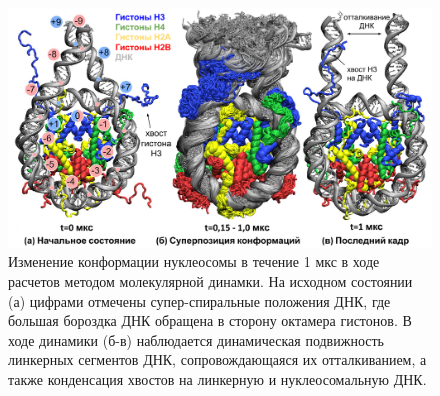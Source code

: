\begin{figure} [H]
    \centering
    \includegraphics[width=\textwidth]{images/p2/jmb/part2_2_f1.pdf}
    \caption{Изменение конформации нуклеосомы в течение 1 мкс в ходе расчетов методом молекулярной динамки. На исходном состоянии (а) цифрами отмечены супер-спиральные положения ДНК, где большая бороздка ДНК обращена в сторону октамера гистонов. В ходе динамики (б-в) наблюдается динамическая подвижность линкерных сегментов ДНК, сопровождающаяся их отталкиванием, а также конденсация хвостов на линкерную и нуклеосомальную ДНК.}
    \label{fig:p2_2_f1}
\end{figure}

 


